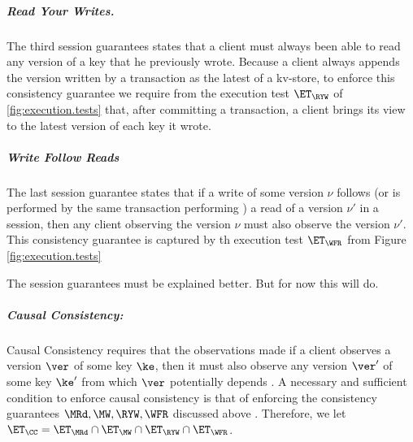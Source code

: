 \subparagraph{Read Your Writes.}
The third session guarantees states that a client must always been able to read any version 
of a key that he previously wrote. Because a client always appends the version written by  
a transaction as the latest of a kv-store, to enforce this consistency guarantee we require from 
the execution test $\ET_{\RYW}$ of \cref{fig:execution.tests} that, after committing a transaction, 
a client brings its view to the latest version of each key it wrote.  

\subparagraph{Write Follow Reads}
The last session guarantee states that if a write of some version $\nu$ follows (or is performed by the same transaction performing ) 
a read of a version $\nu'$ in a session, 
then any client observing the version $\nu$ must also observe the version $\nu'$. This consistency guarantee is 
captured by th execution test $\ET_{\WFR}$ from Figure \cref{fig:execution.tests}

\ac{The session guarantees must be explained better. But for now this will do.}

\subparagraph{Causal Consistency: }
Causal Consistency requires that the observations made if a client observes a version 
$\ver$ of some key $\ke$, then it must also observe any version $\ver'$ of some key $\ke'$ 
from which $\ver$ potentially depends \cite{cops}. A necessary and sufficient condition to enforce 
causal consistency is that of enforcing the consistency guarantees $\MRd, \MW, \RYW, \WFR$ 
discussed above \cite{session2causal}. Therefore, we let $\ET_{\CC} = \ET_{\MRd} \cap \ET_{\MW} 
\cap \ET_{\RYW} \cap \ET_{\WFR}$.

